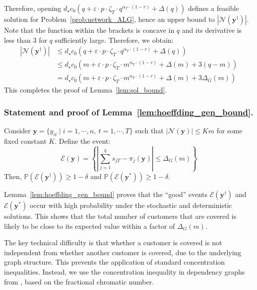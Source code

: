 \documentclass[nonblindrev]{informs3noheader}
\def\P{\mathbb{P}}
\def\calE{\mathcal{E}}
\def\calN{\mathcal{N}}
\def\by{\boldsymbol{y}}
\begin{document}
Therefore, opening $d_\star c_0 \left(q + \varepsilon\cdot p \cdot\zeta_T\cdot q^{\alpha_T\cdot(1-r)} + \Delta(q) \right)$ defines a feasible solution for Problem~\eqref{prob:network_ALG}, hence an upper bound to $|\calN(\by^\dagger)|$. Note that the function within the brackets is concave in $q$ and its derivative is less than 3 for $q$ sufficiently large. Therefore, we obtain:
\begin{align*}
    |\calN(\by^\dagger)|&\leq d_\star c_0 \left(q + \varepsilon\cdot p \cdot \zeta_T\cdot q^{\alpha_T\cdot(1-r)} + \Delta(q)\right)\\
    &\leq d_\star c_0 \left(m + \varepsilon\cdot p \cdot\zeta_T\cdot m^{\alpha_T\cdot(1-r)} + \Delta(m)+3(q-m)\right)\\
    &= d_\star c_0 \left(m + \varepsilon\cdot p \cdot\zeta_T\cdot m^{\alpha_T\cdot(1-r)}+ \Delta(m)+3\Delta_G(m)\right)
\end{align*}
This completes the proof of Lemma~\ref{lem:sol_bound}.
\hfill\Halmos

\subsubsection*{Statement and proof of Lemma~\ref{lem:hoeffding_gen_bound}.}

\begin{lemma}\label{lem:hoeffding_gen_bound}
   Consider $\by=\{y_{it}\mid i=1,\cdots,n,\ t=1,\cdots,T\}$ such that $|\calN(\by)|\leq Km$ for some fixed constant $K$. Define the event:
   \begin{equation}
    \calE(\by)=\left\{\left|\sum_{j=1}^q s_{jT} - \pi_{j}(\by)\right|\leq \Delta_G(m)\right\}	\label{eq:Ek_gen}
    \end{equation}
    Then, $\P(\calE(\by^\dagger))\geq 1-\delta$ and $\P(\calE(\by^*))\geq 1-\delta$.
\end{lemma}

Lemma~\ref{lem:hoeffding_gen_bound} proves that the ``good'' events $\calE(\by^\dagger)$ and $\calE(\by^*)$ occur with high probability under the stochastic and deterministic solutions. This shows that the total number of customers that are covered is likely to be close to its expected value within a factor of $\Delta_G(m)$.

The key technical difficulty is that whether a customer is covered is not independent from whether another customer is covered, due to the underlying graph structure. This prevents the application of standard concentration inequalities. Instead, we use the concentration inequality in dependency graphs from \cite{janisch2024berry}, based on the fractional chromatic number.
\end{document}
